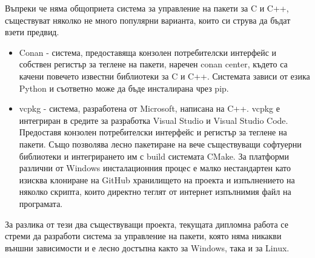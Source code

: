 Въпреки че няма общоприета система за управление на пакети за C и C++,
съществуват няколко не много популярни варианта, които си струва да бъдат взети
предвид.

\begin{itemize}
    \item Conan - система, предоставяща конзолен потребителски интерфейс и
          собствен регистър за теглене на пакети, наречен conan center, където
          са качени повечето известни библиотеки за C и C++. Системата зависи от
          езика Python и съответно може да бъде инсталирана чрез pip.
    \item vcpkg - система, разработена от Microsoft, написана на C++. vcpkg е
          интегриран в средите за разработка Visual Studio и Visual Studio Code.
          Предоставя конзолен потребителски интерфейс и регистър за теглене на
          пакети. Също позволява лесно пакетиране на вече съществуващи софтуерни
          библиотеки и интегрирането им с build системата CMake. За платформи
          различни от Windows инсталационния процес е малко нестандартен като
          изисква клониране на GitHub хранилището на проекта и изпълнението на
          няколко скрипта, които директно теглят от интернет изпълнимия файл на
          програмата.
\end{itemize}

За разлика от тези два съществуващи проекта, текущата дипломна работа се стреми
да разработи система за управление на пакети, която няма никакви външни
зависимости и е лесно достъпна както за Windows, така и за Linux.

